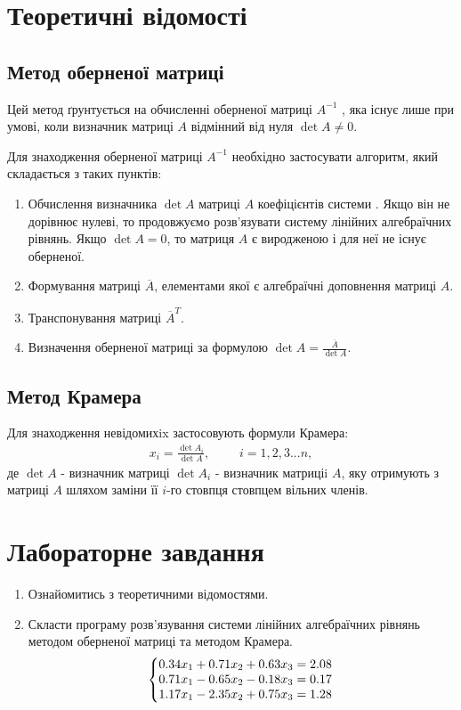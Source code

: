 \documentclass{article}
\begin{document}
\begin{large}
		\section*{Теоретичні відомості}
		\subsection*{Метод оберненої матриці}
		Цей метод ґрунтується на обчисленні
		оберненої матриці $A^{-1}$ , яка існує лише при умові, коли визначник матриці $A$
		відмінний від нуля $\det{A}\ne0$.
		
		Для знаходження оберненої матриці $A^{-1}$ необхідно застосувати алгоритм,
		який складається з таких пунктів:
		\begin{enumerate}
			\item Обчислення визначника $\det{A}$ матриці $A$ коефіцієнтів системи . Якщо він
			не дорівнює нулеві, то продовжуємо розв’язувати систему лінійних алгебраїчних рівнянь. Якщо $\det{A}=0$,
			то матриця $A$ є виродженою і для неї не існує оберненої.
			\item Формування матриці $\overline{A}$, елементами якої є алгебраїчні доповнення
			матриці $A$.
			\item Транспонування матриці $\overline{A}^T$.
			\item Визначення оберненої матриці за формулою $\det{A}=\frac{\overline{A}}{\det{A}}$.
		\end{enumerate}
	
		\subsection*{Метод Крамера}
		Для знаходження невідомихix застосовують
		формули Крамера:
		\begin{gather}\nonumber
			x_i=\frac{\det{A_i}}{\det{A}}, \hspace{28pt}i=1,2,3...n, 
		\end{gather}
		де $\det{A}$ - визначник матриці $\det{A_i}$ - визначник матриціi $A$, яку отримують з
		матриці $A$ шляхом заміни її  $i$-го стовпця стовпцем вільних членів.

		\section*{Лабораторне завдання}
		\begin{enumerate}
			\item Ознайомитись з теоретичними відомостями.
			\item Скласти програму розв’язування системи лінійних алгебраїчних рівнянь
			методом оберненої матриці та методом Крамера.
			\begin{gather}\nonumber
				\left\{\begin{array}{@{}l@{}}
				0.34x_1 + 0.71x_2 + 0.63x_3 = 2.08\\\nonumber
				0.71x_1 - 0.65x_2 - 0.18x_3 = 0.17\\\nonumber
				1.17x_1 - 2.35x_2 + 0.75x_3 = 1.28\nonumber
				\end{array}\right.\,
			\end{gather}
		\end{enumerate}


\end{large}
\end{document}
